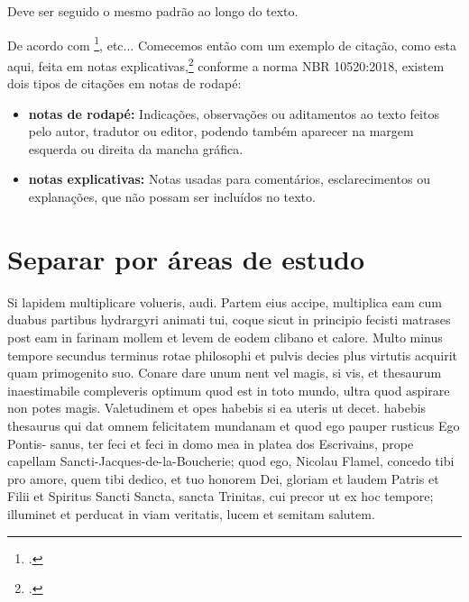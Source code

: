 \documentclass[
	12pt,				%
	oneside, %
	a4paper,			%
	english,			%
	brazil				%
	]{abntex2}
\begin{document}
Deve ser seguido o mesmo padrão ao longo do texto.

De acordo com \footcite[Descartes foi um grande filósofo francês do século XVII. Veja em][p.~10]{descartes-carta-mersene},  etc... Comecemos então com um exemplo de citação, como esta aqui, feita em notas explicativas,\footcite[Esta é uma nota explicativa. Cf. e.g.,][\S 12]{boyle1772} conforme a norma NBR 10520:2018, existem dois tipos de citações em notas de rodapé:

\begin{citacao}
	\begin{itemize}
		\item[$3.6$] \textbf{notas de rodapé:} Indicações, observações ou aditamentos ao texto feitos pelo autor, tradutor ou editor, podendo	também aparecer na margem esquerda ou direita da mancha gráfica.
		\item[$3.7$] \textbf{notas explicativas:} Notas usadas para comentários, esclarecimentos ou explanações, que não possam ser incluídos no texto.
	\end{itemize}
\end{citacao}



\section{Separar por áreas de estudo}

Si lapidem multiplicare volueris, audi. Partem eius accipe, multiplica eam cum duabus partibus hydrargyri animati tui, coque sicut in principio fecisti
matrases post eam in farinam mollem et levem de eodem clibano et calore. Multo minus tempore secundus terminus rotae philosophi et pulvis decies plus virtutis acquirit quam primogenito suo. Conare dare unum nent
vel magis, si vis, et thesaurum inaestimabile compleveris optimum quod est in toto mundo, ultra quod aspirare non potes magis. Valetudinem et opes habebis si ea uteris ut decet. habebis thesaurus qui dat omnem felicitatem mundanam et quod ego pauper rusticus Ego Pontis- sanus, ter feci et feci in domo mea in platea dos Escrivains, prope capellam Sancti-Jacques-de-la-Boucherie; quod ego, Nicolau Flamel, concedo tibi pro amore, quem tibi dedico, et tuo honorem Dei, gloriam et laudem Patris et Filii et Spiritus Sancti Sancta, sancta Trinitas, cui precor ut ex hoc tempore; illuminet et perducat in viam veritatis, lucem et semitam salutem.
\end{document}
